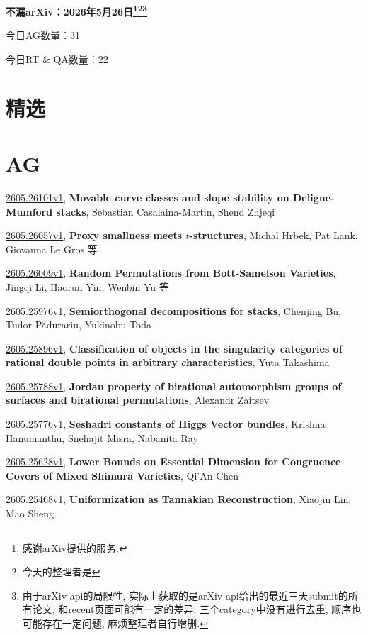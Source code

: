 \documentclass[9pt, a4paper]{article}
\theoremstyle{plain}
\theoremstyle{definition}
\theoremstyle{remark}
\newcommand{\arxiv}[3]{\href{https://arxiv.org/abs/#1}{#1}, \textbf{\textcolor{arxivblue}{#2}}, #3}
\newcommand{\AGnumber}{31}
\newcommand{\RTQAnumber}{22}
\newcommand{\NewestDate}{2026年5月26日}
\newcommand{\todayarXiver}{} %
\begin{document}
\begin{center}
    \Huge\textbf{不漏arXiv：\NewestDate\footnote{感谢arXiv提供的服务.}\footnote{今天的整理者是\todayarXiver}\footnote{由于arXiv api的局限性, 实际上获取的是arXiv api给出的最近三天submit的所有论文, 和recent页面可能有一定的差异. 三个category中没有进行去重, 顺序也可能存在一定问题, 麻烦整理者自行增删.}} \\
\end{center}

\setcounter{section}{-1}

\begin{center}
    今日AG数量：\AGnumber
    
    今日RT \& QA数量：\RTQAnumber
    
\end{center}


\section{精选}


\section{AG}
\arxiv{2605.26101v1}{Movable curve classes and slope stability on Deligne-Mumford stacks}{Sebastian Casalaina-Martin, Shend Zhjeqi}

\arxiv{2605.26057v1}{Proxy smallness meets $t$-structures}{Michal Hrbek, Pat Lank, Giovanna Le Gros 等}

\arxiv{2605.26009v1}{Random Permutations from Bott-Samelson Varieties}{Jingqi Li, Haorun Yin, Wenbin Yu 等}

\arxiv{2605.25976v1}{Semiorthogonal decompositions for stacks}{Chenjing Bu, Tudor Pădurariu, Yukinobu Toda}

\arxiv{2605.25896v1}{Classification of objects in the singularity categories of rational double points in arbitrary characteristics}{Yuta Takashima}

\arxiv{2605.25788v1}{Jordan property of birational automorphism groups of surfaces and birational permutations}{Alexandr Zaitsev}

\arxiv{2605.25776v1}{Seshadri constants of Higgs Vector bundles}{Krishna Hanumanthu, Snehajit Misra, Nabanita Ray}

\arxiv{2605.25628v1}{Lower Bounds on Essential Dimension for Congruence Covers of Mixed Shimura Varieties}{Qi'An Chen}

\arxiv{2605.25468v1}{Uniformization as Tannakian Reconstruction}{Xiaojin Lin, Mao Sheng}
\end{document}
